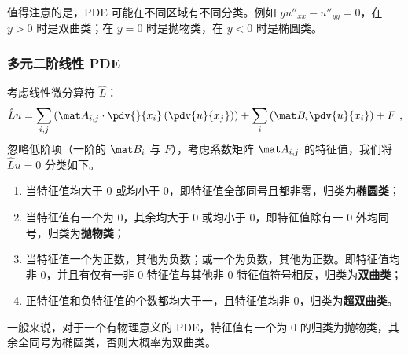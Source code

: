 值得注意的是，PDE 可能在不同区域有不同分类。例如 $y u''_{xx} - u''_{yy} = 0$，在 $y> 0$ 时是双曲类；在 $y=0$ 时是抛物类，在 $y<0$ 时是椭圆类。
\subsubsection{多元二阶线性 PDE}
考虑线性微分算符 $\hat L$：
\begin{equation}
\hat L u = \sum_{i, j}\left(\mat A_{i, j} \cdot \pdv{}{x_i}\left(\pdv{u}{x_j}\right)\right) + \sum_{i}\left(\mat B_{i} \pdv{u}{x_i}\right) + F~,
\end{equation}
忽略低阶项（一阶的 $\mat B_{i}$ 与 $F$），考虑系数矩阵 $\mat A_{i,j}$ 的特征值，我们将 $\hat Lu=0$ 分类如下。
\begin{enumerate}
\item 当特征值均大于 $0$ 或均小于 $0$，即特征值全部同号且都非零，归类为\textbf{椭圆类}；
\item 当特征值有一个为 $0$，其余均大于 $0$ 或均小于 $0$，即特征值除有一 $0$ 外均同号，归类为\textbf{抛物类}；
\item 当特征值一个为正数，其他为负数；或一个为负数，其他为正数。即特征值均非 $0$，并且有仅有一非 $0$ 特征值与其他非 $0$ 特征值符号相反，归类为\textbf{双曲类}；
\item 正特征值和负特征值的个数都均大于一，且特征值均非 $0$，归类为\textbf{超双曲类}。
\end{enumerate}
一般来说，对于一个有物理意义的 PDE，特征值有一个为 $0$ 的归类为抛物类，其余全同号为椭圆类，否则大概率为双曲类。
